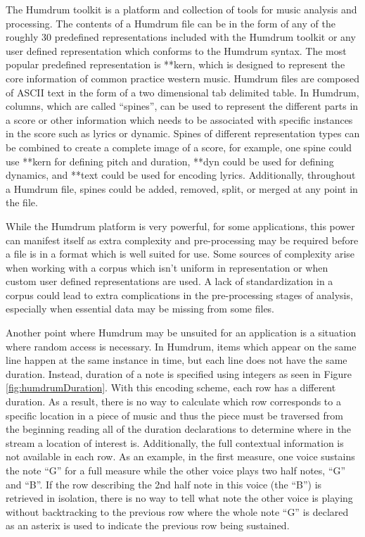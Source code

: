 The Humdrum toolkit \citep*{Huro02,Huro97} is a platform and collection of tools for music analysis and processing. The contents of a Humdrum file can be in the form of any of the roughly 30 predefined representations included with the Humdrum toolkit or any user defined representation which conforms to the Humdrum syntax. The most popular predefined representation is **kern, which is designed to represent the core information of common practice western music. Humdrum files are composed of ASCII text in the form of a two dimensional tab delimited table. In Humdrum, columns, which are called ``spines'', can be used to represent the different parts in a score or other information which needs to be associated with specific instances in the score such as lyrics or dynamic. Spines of different representation types can be combined to create a complete image of a score, for example, one spine could use **kern for defining pitch and duration, **dyn could be used for defining dynamics, and **text could be used for encoding lyrics. Additionally, throughout a Humdrum file, spines could be added, removed, split, or merged at any point in the file.

While the Humdrum platform is very powerful, for some applications, this power can manifest itself as extra complexity and pre-processing may be required before a file is in a format which is well suited for use. Some sources of complexity arise when working with a corpus which isn't uniform in representation or when custom user defined representations are used. A lack of standardization in a corpus could lead to extra complications in the pre-processing stages of analysis, especially when essential data may be missing from some files.

Another point where Humdrum may be unsuited for an application is a situation where random access is necessary. In Humdrum, items which appear on the same line happen at the same instance in time, but each line does not have the same duration. Instead, duration of a note is specified using integers as seen in Figure \ref{fig:humdrumDuration}. With this encoding scheme, each row has a different duration. As a result, there is no way to calculate which row corresponds to a specific location in a piece of music and thus the piece must be traversed from the beginning reading all of the duration declarations to determine where in the stream a location of interest is. Additionally, the full contextual information is not available in each row. As an example, in the first measure, one voice sustains the note ``G'' for a full measure while the other voice plays two half notes, ``G'' and ``B''. If the row describing the 2nd half note in this voice (the ``B'') is retrieved in isolation, there is no way to tell what note the other voice is playing without backtracking to the previous row where the whole note ``G'' is declared as an asterix is used to indicate the previous row being sustained.

